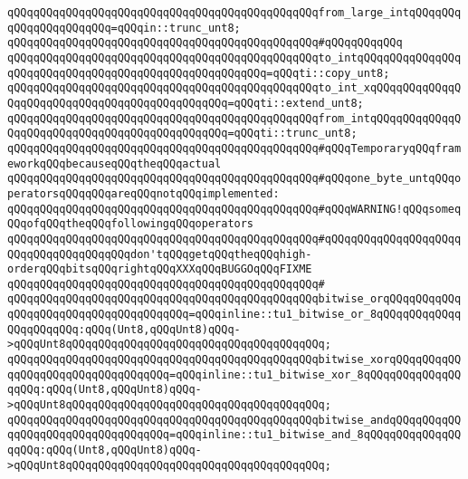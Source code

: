 \verb|qQQqqQQqqQQqqQQqqQQqqQQqqQQqqQQqqQQqqQQqqQQqqQQqfrom_large_intqQQqqQQqqQQqqQQqqQQqqQQq=qQQqin::trunc_unt8;|\newline
\verb|qQQqqQQqqQQqqQQqqQQqqQQqqQQqqQQqqQQqqQQqqQQqqQQq#qQQqqQQqqQQq|\newline
\verb|qQQqqQQqqQQqqQQqqQQqqQQqqQQqqQQqqQQqqQQqqQQqqQQqto_intqQQqqQQqqQQqqQQqqQQqqQQqqQQqqQQqqQQqqQQqqQQqqQQqqQQqqQQq=qQQqti::copy_unt8;|\newline
\verb|qQQqqQQqqQQqqQQqqQQqqQQqqQQqqQQqqQQqqQQqqQQqqQQqto_int_xqQQqqQQqqQQqqQQqqQQqqQQqqQQqqQQqqQQqqQQqqQQqqQQq=qQQqti::extend_unt8;|\newline
\verb|qQQqqQQqqQQqqQQqqQQqqQQqqQQqqQQqqQQqqQQqqQQqqQQqfrom_intqQQqqQQqqQQqqQQqqQQqqQQqqQQqqQQqqQQqqQQqqQQqqQQq=qQQqti::trunc_unt8;|\newline
\newline
\newline
\newline
\verb|qQQqqQQqqQQqqQQqqQQqqQQqqQQqqQQqqQQqqQQqqQQqqQQq#qQQqTemporaryqQQqframeworkqQQqbecauseqQQqtheqQQqactual|\newline
\verb|qQQqqQQqqQQqqQQqqQQqqQQqqQQqqQQqqQQqqQQqqQQqqQQq#qQQqone_byte_untqQQqoperatorsqQQqqQQqareqQQqnotqQQqimplemented:|\newline
\newline
\verb|qQQqqQQqqQQqqQQqqQQqqQQqqQQqqQQqqQQqqQQqqQQqqQQq#qQQqWARNING!qQQqsomeqQQqofqQQqtheqQQqfollowingqQQqoperators|\newline
\verb|qQQqqQQqqQQqqQQqqQQqqQQqqQQqqQQqqQQqqQQqqQQqqQQq#qQQqqQQqqQQqqQQqqQQqqQQqqQQqqQQqqQQqqQQqdon'tqQQqgetqQQqtheqQQqhigh-orderqQQqbitsqQQqrightqQQqXXXqQQqBUGGOqQQqFIXME|\newline
\verb|qQQqqQQqqQQqqQQqqQQqqQQqqQQqqQQqqQQqqQQqqQQqqQQq#|\newline
\verb|qQQqqQQqqQQqqQQqqQQqqQQqqQQqqQQqqQQqqQQqqQQqqQQqbitwise_orqQQqqQQqqQQqqQQqqQQqqQQqqQQqqQQqqQQqqQQq=qQQqinline::tu1_bitwise_or_8qQQqqQQqqQQqqQQqqQQqqQQq:qQQq(Unt8,qQQqUnt8)qQQq->qQQqUnt8qQQqqQQqqQQqqQQqqQQqqQQqqQQqqQQqqQQqqQQq;|\newline
\verb|qQQqqQQqqQQqqQQqqQQqqQQqqQQqqQQqqQQqqQQqqQQqqQQqbitwise_xorqQQqqQQqqQQqqQQqqQQqqQQqqQQqqQQqqQQq=qQQqinline::tu1_bitwise_xor_8qQQqqQQqqQQqqQQqqQQq:qQQq(Unt8,qQQqUnt8)qQQq->qQQqUnt8qQQqqQQqqQQqqQQqqQQqqQQqqQQqqQQqqQQqqQQq;|\newline
\verb|qQQqqQQqqQQqqQQqqQQqqQQqqQQqqQQqqQQqqQQqqQQqqQQqbitwise_andqQQqqQQqqQQqqQQqqQQqqQQqqQQqqQQqqQQq=qQQqinline::tu1_bitwise_and_8qQQqqQQqqQQqqQQqqQQq:qQQq(Unt8,qQQqUnt8)qQQq->qQQqUnt8qQQqqQQqqQQqqQQqqQQqqQQqqQQqqQQqqQQqqQQq;|\newline
